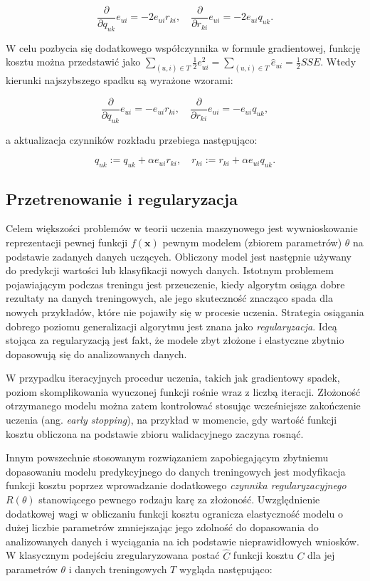 \documentclass{pracamgr}
\begin{document}
\[
\frac{\partial}{\partial q_{uk}}e_{ui} = -2e_{ui} r_{ki}, \quad
\frac{\partial}{\partial r_{ki}}e_{ui} = -2e_{ui} q_{uk}.
\]

W celu pozbycia się dodatkowego współczynnika w formule gradientowej, funkcję kosztu można przedstawić jako $\sum_{(u,i) \in T} \frac{1}{2} e_{ui}^2 = \sum_{(u,i) \in T} \hat{e}_{ui} = \frac{1}{2} SSE$. Wtedy kierunki najszybszego spadku są wyrażone wzorami:

\[
\frac{\partial}{\partial q_{uk}}e_{ui} = -e_{ui} r_{ki}, \quad
\frac{\partial}{\partial r_{ki}}e_{ui} = -e_{ui} q_{uk},
\]

a aktualizacja czynników rozkładu przebiega następująco:

\[
q_{uk} := q_{uk} + \alpha e_{ui} r_{ki}, \quad
r_{ki} := r_{ki} + \alpha e_{ui} q_{uk}.
\]

\subsection{Przetrenowanie i regularyzacja}

Celem większości problemów w teorii uczenia maszynowego jest wywnioskowanie reprezentacji pewnej funkcji $f(\mathbf{x})$ pewnym modelem (zbiorem parametrów) $\theta$ na podstawie zadanych danych uczących. Obliczony model jest następnie używany do predykcji wartości lub klasyfikacji nowych danych. Istotnym problemem pojawiającym podczas treningu jest przeuczenie, kiedy algorytm osiąga dobre rezultaty na danych treningowych, ale jego skuteczność znacząco spada dla nowych przykładów, które nie pojawiły się w procesie uczenia. Strategia osiągania dobrego poziomu generalizacji algorytmu jest znana jako \textit{regularyzacja}. Ideą stojąca za regularyzacją jest fakt, że modele zbyt złożone i elastyczne zbytnio dopasowują się do analizowanych danych. 

W przypadku iteracyjnych procedur uczenia, takich jak gradientowy spadek, poziom skomplikowania wyuczonej funkcji rośnie wraz z liczbą iteracji. Złożoność otrzymanego modelu można zatem kontrolować stosując wcześniejsze zakończenie uczenia (ang. \textit{early stopping}), na przykład w momencie, gdy wartość funkcji kosztu obliczona na podstawie zbioru walidacyjnego zaczyna rosnąć.

Innym powszechnie stosowanym rozwiązaniem zapobiegającym zbytniemu dopasowaniu modelu predykcyjnego do danych treningowych jest modyfikacja funkcji kosztu poprzez wprowadzanie dodatkowego \textit{czynnika regularyzacyjnego} $R(\theta)$ stanowiącego pewnego rodzaju karę za złożoność. Uwzględnienie dodatkowej wagi w obliczaniu funkcji kosztu ogranicza elastyczność modelu o dużej liczbie parametrów zmniejszając jego zdolność do dopasowania do analizowanych danych i wyciągania na ich podstawie nieprawidłowych wniosków. W klasycznym podejściu zregularyzowana postać $\hat{C}$ funkcji kosztu $C$ dla jej parametrów $\theta$ i danych treningowych $T$ wygląda następująco:
\end{document}
